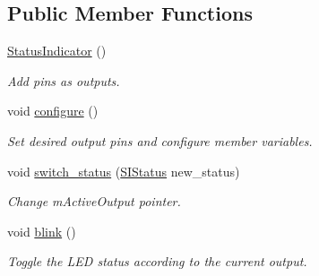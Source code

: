 \subsection*{Public Member Functions}
\begin{DoxyCompactItemize}
\item 
\hyperlink{classSPMB_1_1StatusIndicator_a61172be891cb8ee07d1b5367c986f939}{Status\+Indicator} ()\hypertarget{classSPMB_1_1StatusIndicator_a61172be891cb8ee07d1b5367c986f939}{}\label{classSPMB_1_1StatusIndicator_a61172be891cb8ee07d1b5367c986f939}

\begin{DoxyCompactList}\small\item\em Add pins as outputs. \end{DoxyCompactList}\item 
void \hyperlink{classSPMB_1_1StatusIndicator_a735be6f013a87f9b184d15d3b39a070e}{configure} ()\hypertarget{classSPMB_1_1StatusIndicator_a735be6f013a87f9b184d15d3b39a070e}{}\label{classSPMB_1_1StatusIndicator_a735be6f013a87f9b184d15d3b39a070e}

\begin{DoxyCompactList}\small\item\em Set desired output pins and configure member variables. \end{DoxyCompactList}\item 
void \hyperlink{classSPMB_1_1StatusIndicator_a95b0c01f39a5e9d50a6741d362e44131}{switch\+\_\+status} (\hyperlink{classSPMB_1_1StatusIndicator_a6d5ae5d45a9147ec76bd72da143fb4de}{S\+I\+Status} new\+\_\+status)\hypertarget{classSPMB_1_1StatusIndicator_a95b0c01f39a5e9d50a6741d362e44131}{}\label{classSPMB_1_1StatusIndicator_a95b0c01f39a5e9d50a6741d362e44131}

\begin{DoxyCompactList}\small\item\em Change m\+Active\+Output pointer. \end{DoxyCompactList}\item 
void \hyperlink{classSPMB_1_1StatusIndicator_a85075f19ea24e2f1a9f44c37b2d5d901}{blink} ()\hypertarget{classSPMB_1_1StatusIndicator_a85075f19ea24e2f1a9f44c37b2d5d901}{}\label{classSPMB_1_1StatusIndicator_a85075f19ea24e2f1a9f44c37b2d5d901}

\begin{DoxyCompactList}\small\item\em Toggle the L\+ED status according to the current output. \end{DoxyCompactList}\end{DoxyCompactItemize}
